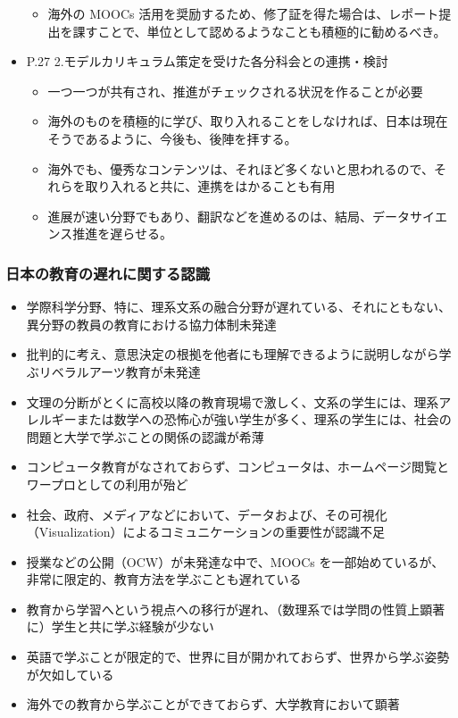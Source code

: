 \documentclass[
]{bxjsbook}
\providecommand{\tightlist}{%
  \setlength{\itemsep}{0pt}\setlength{\parskip}{0pt}}
\theoremstyle{definition}
\theoremstyle{definition}
\theoremstyle{definition}
\theoremstyle{definition}
\theoremstyle{remark}
\begin{document}
\begin{itemize}
  \begin{itemize}
  \tightlist
  \item
    海外の MOOCs 活用を奨励するため、修了証を得た場合は、レポート提出を課すことで、単位として認めるようなことも積極的に勧めるべき。
  \end{itemize}
\item
  P.27 2.モデルカリキュラム策定を受けた各分科会との連携・検討

  \begin{itemize}
  \tightlist
  \item
    一つ一つが共有され、推進がチェックされる状況を作ることが必要
  \item
    海外のものを積極的に学び、取り入れることをしなければ、日本は現在そうであるように、今後も、後陣を拝する。
  \item
    海外でも、優秀なコンテンツは、それほど多くないと思われるので、それらを取り入れると共に、連携をはかることも有用
  \item
    進展が速い分野でもあり、翻訳などを進めるのは、結局、データサイエンス推進を遅らせる。
  \end{itemize}
\end{itemize}

\hypertarget{ux65e5ux672cux306eux6559ux80b2ux306eux9045ux308cux306bux95a2ux3059ux308bux8a8dux8b58}{%
\subsubsection{日本の教育の遅れに関する認識}\label{ux65e5ux672cux306eux6559ux80b2ux306eux9045ux308cux306bux95a2ux3059ux308bux8a8dux8b58}}

\begin{itemize}
\tightlist
\item
  学際科学分野、特に、理系文系の融合分野が遅れている、それにともない、異分野の教員の教育における協力体制未発達
\item
  批判的に考え、意思決定の根拠を他者にも理解できるように説明しながら学ぶリベラルアーツ教育が未発達
\item
  文理の分断がとくに高校以降の教育現場で激しく、文系の学生には、理系アレルギーまたは数学への恐怖心が強い学生が多く、理系の学生には、社会の問題と大学で学ぶことの関係の認識が希薄
\item
  コンピュータ教育がなされておらず、コンピュータは、ホームページ閲覧とワープロとしての利用が殆ど
\item
  社会、政府、メディアなどにおいて、データおよび、その可視化（Visualization）によるコミュニケーションの重要性が認識不足
\item
  授業などの公開（OCW）が未発達な中で、MOOCs を一部始めているが、非常に限定的、教育方法を学ぶことも遅れている
\item
  教育から学習へという視点への移行が遅れ、（数理系では学問の性質上顕著に）学生と共に学ぶ経験が少ない
\item
  英語で学ぶことが限定的で、世界に目が開かれておらず、世界から学ぶ姿勢が欠如している
\item
  海外での教育から学ぶことができておらず、大学教育において顕著
\end{itemize}
\end{document}

